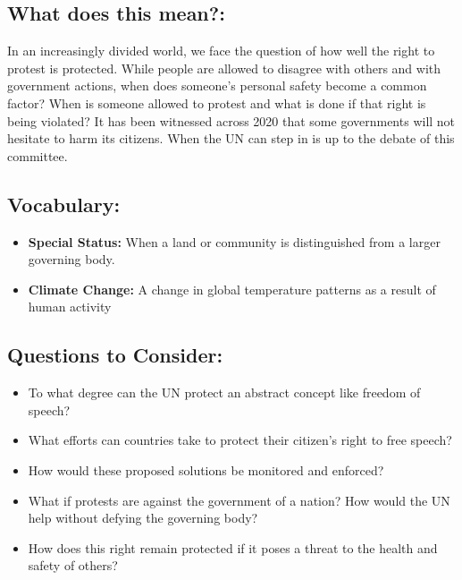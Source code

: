 \documentclass[10pt, letterpaper]{article}
\begin{document}
\subsection{What does this mean?:}

In an increasingly divided world, we face the question of how well the
right to protest is protected. While people are allowed to disagree with
others and with government actions, when does someone's personal safety
become a common factor? When is someone allowed to protest and what is
done if that right is being violated? It has been witnessed across 2020
that some governments will not hesitate to harm its citizens. When the
UN can step in is up to the debate of this committee. \\

\subsection{Vocabulary:}
\begin{itemize}
\item
  
  \textbf{Special Status:} When a land or community is distinguished
  from a larger governing body.
  
\item
  
  \textbf{Climate Change:} A change in global temperature patterns as a
  result of human activity
  
\end{itemize}

\subsection{Questions to Consider:}

\begin{itemize}
\item
  
  To what degree can the UN protect an abstract concept like freedom of
  speech?
  
\item
  
  What efforts can countries take to protect their citizen's right to
  free speech?
  
\item
  
  How would these proposed solutions be monitored and enforced?
  
\item
  
  What if protests are against the government of a nation? How would the
  UN help without defying the governing body?
  
\item
  
  How does this right remain protected if it poses a threat to the
  health and safety of others?
  
\end{itemize}
\end{document}
